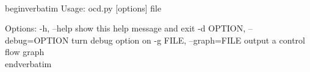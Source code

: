 \\begin{verbatim}
Usage: ocd.py [options] file

Options:
  -h, --help            show this help message and exit
  -d OPTION, --debug=OPTION
                        turn debug option on
  -g FILE, --graph=FILE
                        output a control flow graph
\\end{verbatim}
